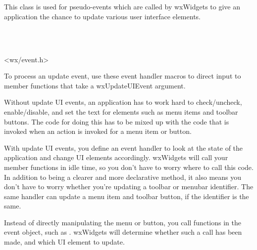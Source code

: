 \section{}\label{wxupdateuievent}

This class is used for pseudo-events which are called by wxWidgets
to give an application the chance to update various user interface elements.


\\
\\


<wx/event.h>


To process an update event, use these event handler macros to direct input to member
functions that take a wxUpdateUIEvent argument.

\twocolwidtha{7cm}
\begin{twocollist}\itemsep=0pt
\end{twocollist}


Without update UI events, an application has to work hard to check/uncheck, enable/disable,
and set the text for elements such as menu items and toolbar buttons.
The code for doing this has to be mixed up with the code that is invoked when
an action is invoked for a menu item or button.

With update UI events, you define an event handler to look at the state of
the application and change UI elements accordingly. wxWidgets will call your
member functions in idle time, so you don't have to worry where to call this code.
In addition to being a clearer and more declarative method, it also means you
don't have to worry whether you're updating a toolbar or menubar identifier.
The same handler can update a menu item and toolbar button, if the identifier is the same.

Instead of directly manipulating the menu or button, you call functions in the event
object, such as . wxWidgets
will determine whether such a call has been made, and which UI element to update.

